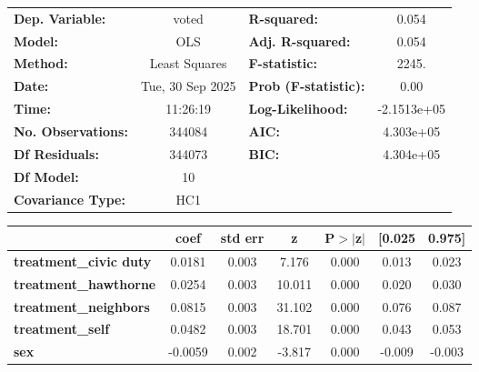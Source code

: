 \begin{center}
\begin{tabular}{lclc}
\toprule
\textbf{Dep. Variable:}        &      voted       & \textbf{  R-squared:         } &      0.054   \\
\textbf{Model:}                &       OLS        & \textbf{  Adj. R-squared:    } &      0.054   \\
\textbf{Method:}               &  Least Squares   & \textbf{  F-statistic:       } &      2245.   \\
\textbf{Date:}                 & Tue, 30 Sep 2025 & \textbf{  Prob (F-statistic):} &      0.00    \\
\textbf{Time:}                 &     11:26:19     & \textbf{  Log-Likelihood:    } & -2.1513e+05  \\
\textbf{No. Observations:}     &      344084      & \textbf{  AIC:               } &  4.303e+05   \\
\textbf{Df Residuals:}         &      344073      & \textbf{  BIC:               } &  4.304e+05   \\
\textbf{Df Model:}             &          10      & \textbf{                     } &              \\
\textbf{Covariance Type:}      &       HC1        & \textbf{                     } &              \\
\bottomrule
\end{tabular}
\begin{tabular}{lcccccc}
                               & \textbf{coef} & \textbf{std err} & \textbf{z} & \textbf{P$> |$z$|$} & \textbf{[0.025} & \textbf{0.975]}  \\
\midrule
\textbf{treatment\_civic duty} &       0.0181  &        0.003     &     7.176  &         0.000        &        0.013    &        0.023     \\
\textbf{treatment\_hawthorne}  &       0.0254  &        0.003     &    10.011  &         0.000        &        0.020    &        0.030     \\
\textbf{treatment\_neighbors}  &       0.0815  &        0.003     &    31.102  &         0.000        &        0.076    &        0.087     \\
\textbf{treatment\_self}       &       0.0482  &        0.003     &    18.701  &         0.000        &        0.043    &        0.053     \\
\textbf{sex}                   &      -0.0059  &        0.002     &    -3.817  &         0.000        &       -0.009    &       -0.003     \\

\end{tabular}
\end{center}
